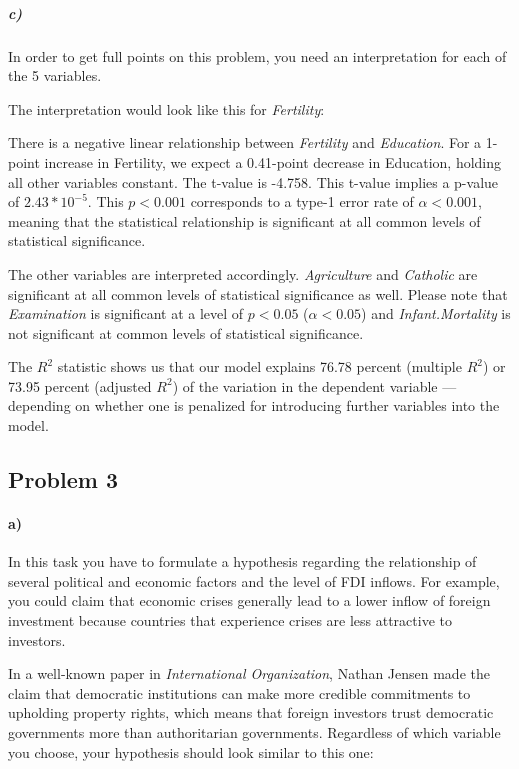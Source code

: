 \documentclass[12pt]{article}\usepackage[]{graphicx}\usepackage[]{color}
\begin{document}
\subparagraph{c)} In order to get full points on this problem, you need an interpretation for each of the 5 variables.

The interpretation would look like this for \textit{Fertility}:

There is a negative linear relationship between \textit{Fertility} and \textit{Education}. For a 1-point increase in Fertility, we expect a 0.41-point decrease in Education, holding all other variables constant. The t-value is -4.758. This t-value implies a p-value of $2.43*10^{-5}$. This $p < 0.001$ corresponds to a type-1 error rate of $\alpha < 0.001$, meaning that the statistical relationship is significant at all common levels of statistical significance.

The other variables are interpreted accordingly. \textit{Agriculture} and \textit{Catholic} are significant at all common levels of statistical significance as well. Please note that \textit{Examination} is significant at a level of $p < 0.05$ ($\alpha < 0.05$) and \textit{Infant.Mortality} is not significant at common levels of statistical significance.

The $R^2$ statistic shows us that our model explains 76.78 percent (multiple $R^2$) or 73.95 percent (adjusted $R^2$) of the variation in the dependent variable --- depending on whether one is penalized for introducing further variables into the model.



\subsection*{Problem 3}

\paragraph{a)} In this task you have to formulate a hypothesis regarding the relationship of several political and economic factors and the level of FDI inflows. For example, you could claim that economic crises generally lead to a lower inflow of foreign investment because countries that experience crises are less attractive to investors.

In a well-known paper in \textit{International Organization}, Nathan Jensen made the claim that democratic institutions can make more credible commitments to upholding property rights, which means that foreign investors trust democratic governments more than authoritarian governments. Regardless of which variable you choose, your hypothesis should look similar to this one:
\end{document}
